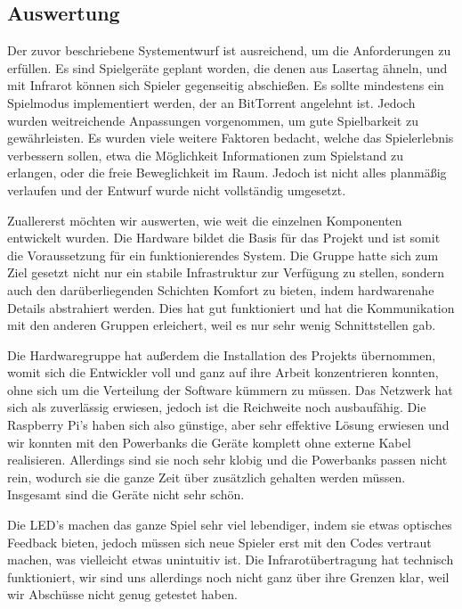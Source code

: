\subsection{Auswertung}
\label{sec:auswertung}

Der zuvor beschriebene Systementwurf ist ausreichend, um die Anforderungen zu
erfüllen. Es sind Spielgeräte geplant worden, die denen aus Lasertag ähneln,
und mit Infrarot können sich Spieler gegenseitig abschießen. Es sollte mindestens ein
Spielmodus implementiert werden, der an BitTorrent angelehnt ist. Jedoch
wurden weitreichende Anpassungen vorgenommen, um gute Spielbarkeit zu gewährleisten. Es wurden viele weitere
Faktoren bedacht, welche das Spielerlebnis verbessern sollen, etwa die
Möglichkeit Informationen zum Spielstand zu erlangen, oder die freie
Beweglichkeit im Raum. Jedoch ist nicht alles planmäßig verlaufen und der
Entwurf wurde nicht vollständig umgesetzt.

Zuallererst möchten wir auswerten, wie weit die einzelnen Komponenten
entwickelt wurden. Die Hardware bildet die Basis für das Projekt und ist somit
die Voraussetzung für ein funktionierendes System. Die Gruppe hatte sich zum
Ziel gesetzt nicht nur ein stabile Infrastruktur zur Verfügung zu stellen,
sondern auch den darüberliegenden Schichten Komfort zu bieten, indem
hardwarenahe Details abstrahiert werden. Dies hat gut funktioniert und hat die
Kommunikation mit den anderen Gruppen erleichert, weil es nur sehr wenig
Schnittstellen gab. 

Die Hardwaregruppe hat außerdem die Installation des 
Projekts übernommen, womit sich die Entwickler voll und ganz auf ihre Arbeit
konzentrieren konnten, ohne sich um die Verteilung der Software kümmern zu
müssen. Das Netzwerk hat sich als zuverlässig erwiesen, jedoch ist die
Reichweite noch ausbaufähig. Die Raspberry Pi's haben sich also günstige, aber
sehr effektive Lösung erwiesen und wir konnten mit den Powerbanks die
Geräte komplett ohne externe Kabel realisieren. Allerdings sind sie noch sehr
klobig und die Powerbanks passen nicht rein, wodurch sie die ganze Zeit über
zusätzlich gehalten werden müssen. Insgesamt sind die Geräte nicht sehr schön.

Die LED's machen das ganze Spiel sehr viel lebendiger, indem sie etwas
optisches Feedback bieten, jedoch müssen sich neue Spieler erst mit den Codes
vertraut machen, was vielleicht etwas unintuitiv ist. Die Infrarotübertragung
hat technisch funktioniert, wir sind uns allerdings noch nicht ganz über ihre
Grenzen klar, weil wir Abschüsse nicht genug getestet haben.

